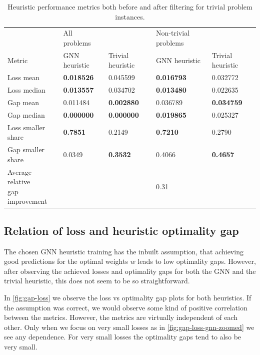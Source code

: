 \documentclass[english, 12pt, a4paper, sci, utf8, a-2b, online]{aaltothesis}
\begin{document}
\begin{table}[]
    \centering
    \caption{Heuristic performance metrics both before and after filtering for trivial problem instances.}
    \label{tab:results}
    \footnotesize
    \begin{tabular}{l|ll|ll}
                                     & All problems  &                   & Non-trivial problems &                   \\
    Metric                           & GNN heuristic & Trivial heuristic & GNN heuristic        & Trivial heuristic \\ \hline
    Loss mean                        & \textbf{0.018526} & 0.045599          & \textbf{0.016793}    & 0.032772          \\
    Loss median                      & \textbf{0.013557} & 0.034702          & \textbf{0.013480}    & 0.022635          \\
    Gap mean                         & 0.011484          & \textbf{0.002880} & 0.036789             & \textbf{0.034759} \\
    Gap median                       & \textbf{0.000000} & \textbf{0.000000} & \textbf{0.019865}    & 0.025327          \\
    Loss smaller share               & \textbf{0.7851}   & 0.2149            & \textbf{0.7210}      & 0.2790            \\
    Gap smaller share                & 0.0349            & \textbf{0.3532}   & 0.4066               & \textbf{0.4657}   \\
    \makecell{Average relative\\gap improvement} &               &                   & 0.31                 &                  
    \end{tabular}
    \end{table}


\subsection{Relation of loss and heuristic optimality gap}
\label{sec:loss-gap-relation}

The chosen GNN heuristic training has the inbuilt assumption, that achieving good predictions for the optimal weights $w$ leads to low optimality gaps. However, after observing the achieved losses and optimality gaps for both the GNN and the trivial heuristic, this does not seem to be so straightforward.

In \cref{fig:gap-loss} we observe the loss vs optimality gap plots for both heuristics. If the assumption was correct, we would observe some kind of positive correlation between the metrics. However, the metrics are virtually independent of each other. Only when we focus on very small losses as in \cref{fig:gap-loss-gnn-zoomed} we see any dependence. For very small losses the optimality gaps tend to also be very small.
\end{document}
